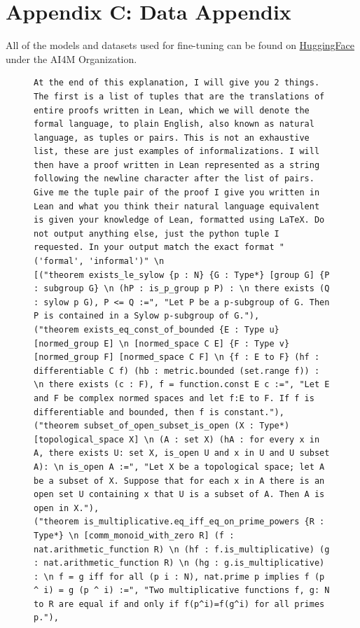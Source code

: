 \documentclass{article} %
\begin{document}
\section{Appendix C: Data Appendix} 
All of the models and datasets used for fine-tuning can be found on \href{https://huggingface.co/AI4M}{HuggingFace} under the AI4M Organization.


\begin{figure}[htbp]
\centering
\begin{mdframed}[linewidth=1pt, roundcorner=10pt, backgroundcolor=gray!10]
\begin{lstlisting}[breaklines=true]
At the end of this explanation, I will give you 2 things. The first is a list of tuples that are the translations of entire proofs written in Lean, which we will denote the formal language, to plain English, also known as natural language, as tuples or pairs. This is not an exhaustive list, these are just examples of informalizations. I will then have a proof written in Lean represented as a string following the newline character after the list of pairs. Give me the tuple pair of the proof I give you written in Lean and what you think their natural language equivalent is given your knowledge of Lean, formatted using LaTeX. Do not output anything else, just the python tuple I requested. In your output match the exact format "('formal', 'informal')" \n
[("theorem exists_le_sylow {p : N} {G : Type*} [group G] {P : subgroup G} \n (hP : is_p_group p P) : \n there exists (Q : sylow p G), P <= Q :=", "Let P be a p-subgroup of G. Then P is contained in a Sylow p-subgroup of G."), 
("theorem exists_eq_const_of_bounded {E : Type u} [normed_group E] \n [normed_space C E] {F : Type v} [normed_group F] [normed_space C F] \n {f : E to F} (hf : differentiable C f) (hb : metric.bounded (set.range f)) : \n there exists (c : F), f = function.const E c :=", "Let E and F be complex normed spaces and let f:E to F. If f is differentiable and bounded, then f is constant."),
("theorem subset_of_open_subset_is_open (X : Type*) [topological_space X] \n (A : set X) (hA : for every x in A, there exists U: set X, is_open U and x in U and U subset A): \n is_open A :=", "Let X be a topological space; let A be a subset of X. Suppose that for each x in A there is an open set U containing x that U is a subset of A. Then A is open in X."),
("theorem is_multiplicative.eq_iff_eq_on_prime_powers {R : Type*} \n [comm_monoid_with_zero R] (f : nat.arithmetic_function R) \n (hf : f.is_multiplicative) (g : nat.arithmetic_function R) \n (hg : g.is_multiplicative) : \n f = g iff for all (p i : N), nat.prime p implies f (p ^ i) = g (p ^ i) :=", "Two multiplicative functions f, g: N to R are equal if and only if f(p^i)=f(g^i) for all primes p."),

\end{lstlisting}
\end{mdframed}
\end{figure}
\end{document}
